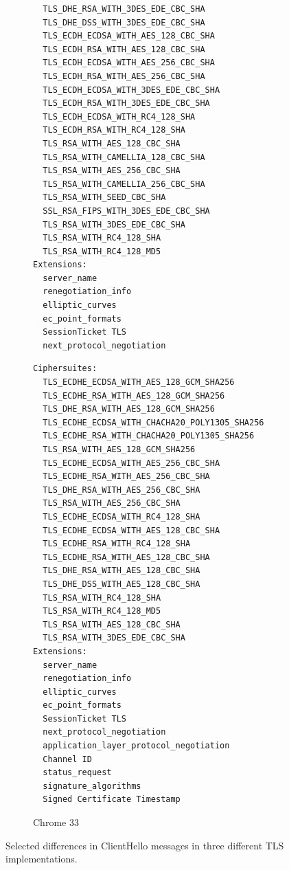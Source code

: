 \documentclass[conference]{IEEEtran}
\begin{document}
\begin{figure}
\begin{subfigure}[t]{0.30\textwidth}
\begin{minipage}[t][57ex][t]{\textwidth}
\begin{verbatim}
  TLS_DHE_RSA_WITH_3DES_EDE_CBC_SHA
  TLS_DHE_DSS_WITH_3DES_EDE_CBC_SHA
  TLS_ECDH_ECDSA_WITH_AES_128_CBC_SHA
  TLS_ECDH_RSA_WITH_AES_128_CBC_SHA
  TLS_ECDH_ECDSA_WITH_AES_256_CBC_SHA
  TLS_ECDH_RSA_WITH_AES_256_CBC_SHA
  TLS_ECDH_ECDSA_WITH_3DES_EDE_CBC_SHA
  TLS_ECDH_RSA_WITH_3DES_EDE_CBC_SHA
  TLS_ECDH_ECDSA_WITH_RC4_128_SHA
  TLS_ECDH_RSA_WITH_RC4_128_SHA
  TLS_RSA_WITH_AES_128_CBC_SHA
  TLS_RSA_WITH_CAMELLIA_128_CBC_SHA
  TLS_RSA_WITH_AES_256_CBC_SHA
  TLS_RSA_WITH_CAMELLIA_256_CBC_SHA
  TLS_RSA_WITH_SEED_CBC_SHA
  SSL_RSA_FIPS_WITH_3DES_EDE_CBC_SHA
  TLS_RSA_WITH_3DES_EDE_CBC_SHA
  TLS_RSA_WITH_RC4_128_SHA
  TLS_RSA_WITH_RC4_128_MD5
Extensions:
  server_name
  renegotiation_info
  elliptic_curves
  ec_point_formats
  SessionTicket TLS
  next_protocol_negotiation
\end{verbatim}
\end{minipage}
\label{fig:ciphersuites:firefox}
\end{subfigure}
%
\begin{subfigure}[t]{0.30\textwidth}
\caption{Chrome 33}
\begin{minipage}[t][42.5ex][t]{\textwidth}
\tiny
\begin{verbatim}
Ciphersuites:
  TLS_ECDHE_ECDSA_WITH_AES_128_GCM_SHA256
  TLS_ECDHE_RSA_WITH_AES_128_GCM_SHA256
  TLS_DHE_RSA_WITH_AES_128_GCM_SHA256
  TLS_ECDHE_ECDSA_WITH_CHACHA20_POLY1305_SHA256
  TLS_ECDHE_RSA_WITH_CHACHA20_POLY1305_SHA256
  TLS_RSA_WITH_AES_128_GCM_SHA256
  TLS_ECDHE_ECDSA_WITH_AES_256_CBC_SHA
  TLS_ECDHE_RSA_WITH_AES_256_CBC_SHA
  TLS_DHE_RSA_WITH_AES_256_CBC_SHA
  TLS_RSA_WITH_AES_256_CBC_SHA
  TLS_ECDHE_ECDSA_WITH_RC4_128_SHA
  TLS_ECDHE_ECDSA_WITH_AES_128_CBC_SHA
  TLS_ECDHE_RSA_WITH_RC4_128_SHA
  TLS_ECDHE_RSA_WITH_AES_128_CBC_SHA
  TLS_DHE_RSA_WITH_AES_128_CBC_SHA
  TLS_DHE_DSS_WITH_AES_128_CBC_SHA
  TLS_RSA_WITH_RC4_128_SHA
  TLS_RSA_WITH_RC4_128_MD5
  TLS_RSA_WITH_AES_128_CBC_SHA
  TLS_RSA_WITH_3DES_EDE_CBC_SHA
Extensions:
  server_name
  renegotiation_info
  elliptic_curves
  ec_point_formats
  SessionTicket TLS
  next_protocol_negotiation
  application_layer_protocol_negotiation
  Channel ID
  status_request
  signature_algorithms
  Signed Certificate Timestamp
\end{verbatim}
\end{minipage}
\label{fig:ciphersuites:chrome}
\end{subfigure}

\caption{
Selected differences in ClientHello messages in three different TLS implementations.
}
\label{fig:ciphersuites}
\end{figure}
\end{document}
